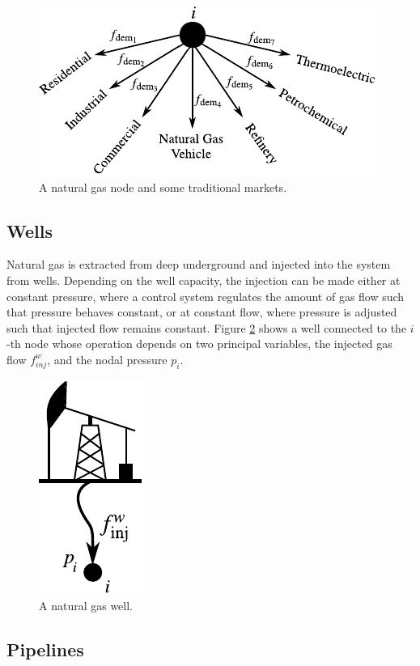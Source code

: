 \begin{figure}[!ht]
	\centering
	\includegraphics[scale=1.2]{Figures/Node}
	\caption{A natural gas node and some traditional markets.}	
	\label{fig:node}
\end{figure}


\subsection{Wells}
\label{subsec:wells}

Natural gas is extracted from deep underground and injected into the system from wells. Depending on the well capacity, the injection can be made either at constant pressure, where a control system regulates the amount of gas flow such that pressure behaves constant, or at constant flow, where pressure is adjusted such that injected flow remains constant. Figure \ref{fig:well} shows a well connected to the $i$-th node whose operation depends on two principal variables, the injected gas flow $f_{inj}^w$, and the nodal pressure $p_i$.

\begin{figure}[!ht]
	\centering
	\includegraphics[scale=0.9]{Figures/Well}
	\caption{A natural gas well.}	
	\label{fig:well}
\end{figure}

\subsection{Pipelines}
\label{subsec:pipelines}

